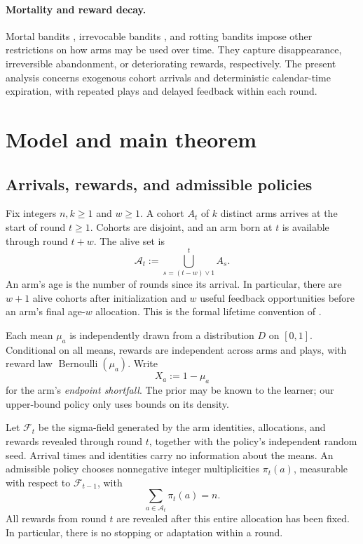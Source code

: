 \documentclass[11pt,letterpaper]{article}
\numberwithin{equation}{section}
\theoremstyle{definition}
\theoremstyle{remark}
\newcommand{\1}{\mathbf{1}}
\newcommand{\F}{\mathcal{F}}
\newcommand{\A}{\mathcal{A}}
\begin{document}
\paragraph{Mortality and reward decay.}
Mortal bandits \citep{chakrabarti2008mortal}, irrevocable bandits
\citep{farias2011irrevocable}, and rotting bandits
\citep{levine2017rotting} impose other restrictions on how arms may
be used over time. They capture disappearance, irreversible abandonment,
or deteriorating rewards, respectively. The present analysis concerns
exogenous cohort arrivals and deterministic calendar-time expiration,
with repeated plays and delayed feedback within each round.

\section{Model and main theorem}\label{sec:model}

\subsection{Arrivals, rewards, and admissible policies}

Fix integers $n,k\ge1$ and $w\ge1$. A cohort $A_t$ of $k$ distinct arms
arrives at the start of round $t\ge1$. Cohorts are disjoint, and an arm
born at $t$ is available through round $t+w$. The alive set is
\[
  \A_t:=\bigcup_{s=(t-w)\vee1}^{t}A_s.
\]
An arm's age is the number of rounds since its arrival. In particular,
there are $w+1$ alive cohorts after initialization and $w$ useful
feedback opportunities before an arm's final age-$w$ allocation.
This is the formal lifetime convention of \citet{jia2023short}.

Each mean $\mu_a$ is independently drawn from a distribution $D$ on
$[0,1]$. Conditional on all means, rewards are independent across
arms and plays, with reward law $\operatorname{Bernoulli}(\mu_a)$.
Write
\[
  X_a:=1-\mu_a
\]
for the arm's \emph{endpoint shortfall}. The prior may be known to
the learner; our upper-bound policy only uses bounds on its density.

Let $\F_t$ be the sigma-field generated by the arm identities, allocations, and rewards
revealed through round $t$, together with the policy's independent
random seed. Arrival times and identities carry no information about
the means. An admissible policy chooses nonnegative integer
multiplicities $\pi_t(a)$, measurable with respect to $\F_{t-1}$, with
\begin{equation}\label{eq:allocation}
  \sum_{a\in\A_t}\pi_t(a)=n.
\end{equation}
All rewards from round $t$ are revealed after this entire allocation
has been fixed. In particular, there is no stopping or adaptation
within a round.
\end{document}
